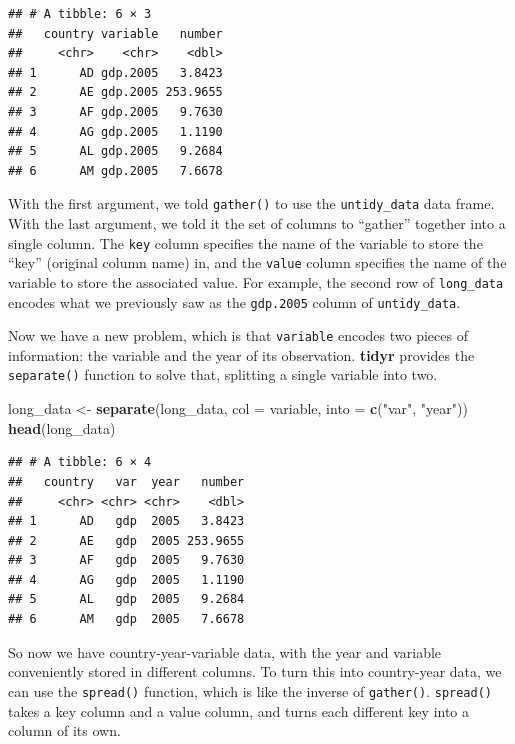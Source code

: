 \documentclass[12pt,oneside,openany]{tufte-book}
\newenvironment{Shaded}{}{}
\newcommand{\KeywordTok}[1]{\textcolor[rgb]{0.00,0.44,0.13}{\textbf{{#1}}}}
\newcommand{\DataTypeTok}[1]{\textcolor[rgb]{0.56,0.13,0.00}{{#1}}}
\newcommand{\StringTok}[1]{\textcolor[rgb]{0.25,0.44,0.63}{{#1}}}
\newcommand{\NormalTok}[1]{{#1}}
\begin{document}
\begin{verbatim}
## # A tibble: 6 × 3
##   country variable   number
##     <chr>    <chr>    <dbl>
## 1      AD gdp.2005   3.8423
## 2      AE gdp.2005 253.9655
## 3      AF gdp.2005   9.7630
## 4      AG gdp.2005   1.1190
## 5      AL gdp.2005   9.2684
## 6      AM gdp.2005   7.6678
\end{verbatim}

With the first argument, we told \texttt{gather()} to use the
\texttt{untidy\_data} data frame. With the last argument, we told it the
set of columns to ``gather'' together into a single column. The
\texttt{key} column specifies the name of the variable to store the
``key'' (original column name) in, and the \texttt{value} column
specifies the name of the variable to store the associated value. For
example, the second row of \texttt{long\_data} encodes what we
previously saw as the \texttt{gdp.2005} column of \texttt{untidy\_data}.

Now we have a new problem, which is that \texttt{variable} encodes two
pieces of information: the variable and the year of its observation.
\textbf{tidyr} provides the \texttt{separate()} function to solve that,
splitting a single variable into two.

\begin{Shaded}
\begin{Highlighting}[]
\NormalTok{long_data <-}\StringTok{ }\KeywordTok{separate}\NormalTok{(long_data, }\DataTypeTok{col =} \NormalTok{variable, }
    \DataTypeTok{into =} \KeywordTok{c}\NormalTok{(}\StringTok{"var"}\NormalTok{, }\StringTok{"year"}\NormalTok{))}
\KeywordTok{head}\NormalTok{(long_data)}
\end{Highlighting}
\end{Shaded}

\begin{verbatim}
## # A tibble: 6 × 4
##   country   var  year   number
##     <chr> <chr> <chr>    <dbl>
## 1      AD   gdp  2005   3.8423
## 2      AE   gdp  2005 253.9655
## 3      AF   gdp  2005   9.7630
## 4      AG   gdp  2005   1.1190
## 5      AL   gdp  2005   9.2684
## 6      AM   gdp  2005   7.6678
\end{verbatim}

So now we have country-year-variable data, with the year and variable
conveniently stored in different columns. To turn this into country-year
data, we can use the \texttt{spread()} function, which is like the
inverse of \texttt{gather()}. \texttt{spread()} takes a key column and a
value column, and turns each different key into a column of its own.
\end{document}
